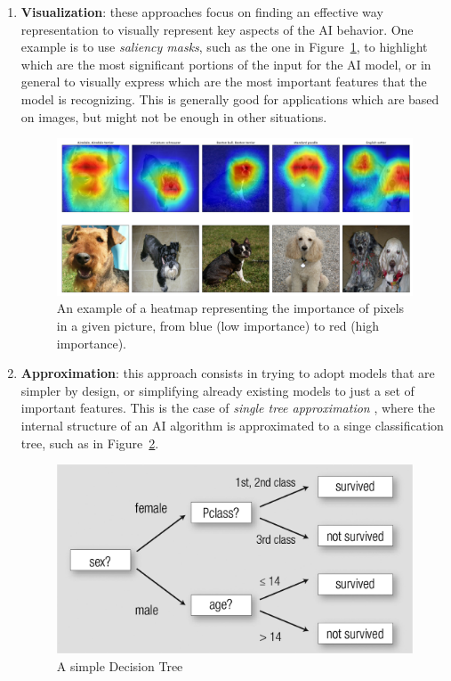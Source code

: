 \documentclass[conference]{IEEEtran}
\newcommand{\cit}[1][]{\todo[tickmarkheight=0.2cm]{cit #1}}
\begin{document}
\begin{enumerate}
    \item \textbf{Visualization}: these approaches focus on finding an effective
          way representation to visually represent key aspects of the AI
          behavior. One example is to use \textit{saliency masks}, such as the
          one in Figure~\ref{fig:heatmap}, to highlight which are the most
          significant portions of the input for the AI model, or in general to
          visually express which are the most important features that the model is recognizing. This is generally good for applications which are based on images, but might not be enough in other situations.

          \begin{figure}[h!] \includegraphics[width=\linewidth]{images/dog_localization.png}
              \caption{An example of a heatmap representing the importance of pixels in a given picture, from blue (low importance) to red (high importance). } \label{fig:heatmap} \end{figure}

    \item \textbf{Approximation}: this approach consists in trying to adopt
          models that are simpler by design, or simplifying already existing models to just a set of important features. This is the case of \textit{single tree approximation} \cit, where the internal structure of an AI algorithm is approximated to a singe classification tree, such as in Figure~\ref{fig:dectree}.

          \begin{figure}[ht!] \centering
              \includegraphics[width=0.9\linewidth]{images/dectree} \caption{A simple
                  Decision Tree} \label{fig:dectree} \end{figure}


\end{enumerate}
\end{document}
